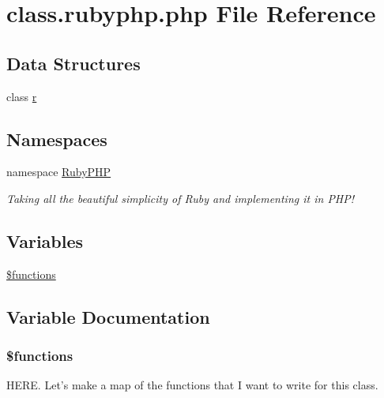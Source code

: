 \hypertarget{class_8rubyphp_8php}{\section{class.\-rubyphp.\-php File Reference}
\label{class_8rubyphp_8php}
}
\subsection*{Data Structures}
\begin{DoxyCompactItemize}
\item 
class \hyperlink{classr}{r}
\end{DoxyCompactItemize}
\subsection*{Namespaces}
\begin{DoxyCompactItemize}
\item 
namespace \hyperlink{namespace_ruby_p_h_p}{Ruby\-P\-H\-P}
\begin{DoxyCompactList}\small\item\em Taking all the beautiful simplicity of Ruby and implementing it in P\-H\-P! \end{DoxyCompactList}\end{DoxyCompactItemize}
\subsection*{Variables}
\begin{DoxyCompactItemize}
\item 
\hyperlink{class_8rubyphp_8php_aa75daea491817f3b64daa2f51128bcdf}{\$functions}
\end{DoxyCompactItemize}


\subsection{Variable Documentation}
\hypertarget{class_8rubyphp_8php_aa75daea491817f3b64daa2f51128bcdf}{
\subsubsection[{\$functions}]{\setlength{\rightskip}{0pt plus 5cm}\$functions}}\label{class_8rubyphp_8php_aa75daea491817f3b64daa2f51128bcdf}
H\-E\-R\-E. Let's make a map of the functions that I want to write for this class.


